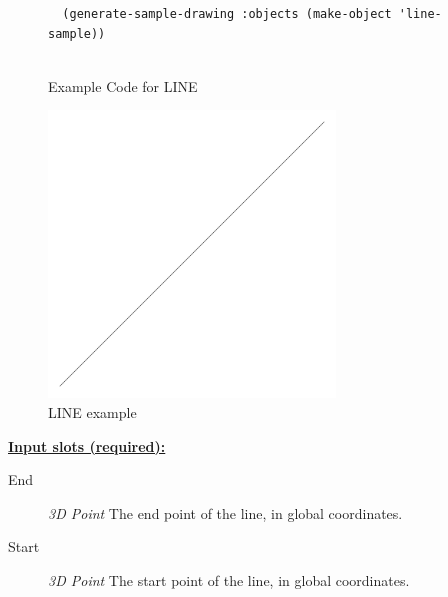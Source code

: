 \documentclass [11pt]{book}
\begin{document}
\begin{itemize}
\begin{figure}
\begin{lrbox}{\boxedverb}
\begin{minipage}{\linewidth}
{\begin{verbatim}
  (generate-sample-drawing :objects (make-object 'line-sample))
  

\end{verbatim}}
\end{minipage}
\end{lrbox}
\fbox{\usebox{\boxedverb}}

\caption{Example Code for LINE}

\label{fig:example-code-LINE}

\end{figure}

\begin{figure}
\begin{center}
\includegraphics[width=3in,height=3in]{../images/example-LINE.pdf}
\end{center}

\caption{LINE example}

\label{fig:LINE}

\end{figure}





\textbf{
\underline{Input slots (required):}}

\begin{description}

\item [End]
\emph{3D Point} The end point of the line, in global coordinates.


\item [Start]
\emph{3D Point} The start point of the line, in global coordinates.


\end{description}







\end{itemize}
\end{document}
